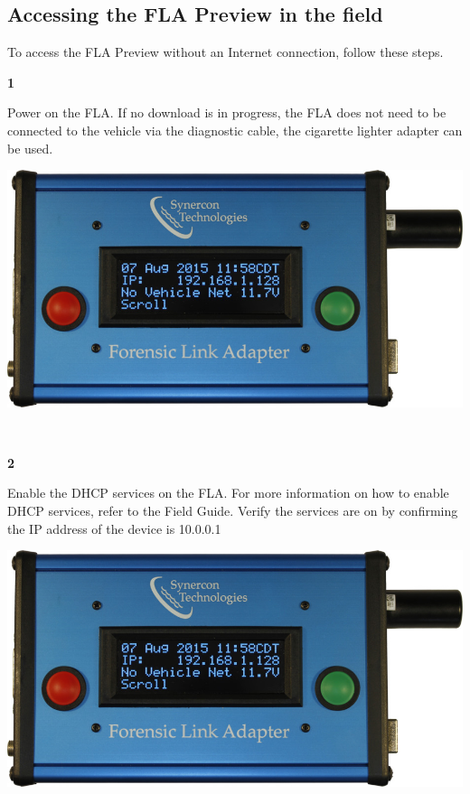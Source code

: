 \documentclass[11pt]{article}
\begin{document}
\subsection{Accessing the FLA Preview in the field}
To access the FLA Preview without an Internet connection, follow these steps.\\[\baselineskip]
\noindent\begin{minipage}{0.3\textwidth}%
\begin{center}
\textbf{1}\\[\baselineskip]
\end{center}
Power on the FLA. If no download is in progress, the FLA does not need to be connected to the vehicle via the diagnostic cable, the cigarette lighter adapter can be used.
\end{minipage}%
\hfill%
\begin{minipage}{0.6\textwidth}
\includegraphics[width=\linewidth]{../../media/fla_screens/ethernet_and_others/main/title_no_net}
\end{minipage}\\[\baselineskip]
\noindent\begin{minipage}{0.3\textwidth}%
\begin{center}
\textbf{2}\\[\baselineskip]
\end{center}
Enable the DHCP services on the FLA. For more information on how to enable DHCP services, refer to the Field Guide. Verify the services are on by confirming the IP address of the device is 10.0.0.1
\end{minipage}%
\hfill%
\begin{minipage}{0.6\textwidth}
\includegraphics[width=\linewidth]{../../media/fla_screens/ethernet_and_others/main/title_no_net}
\end{minipage}\\[\baselineskip]
\end{document}
